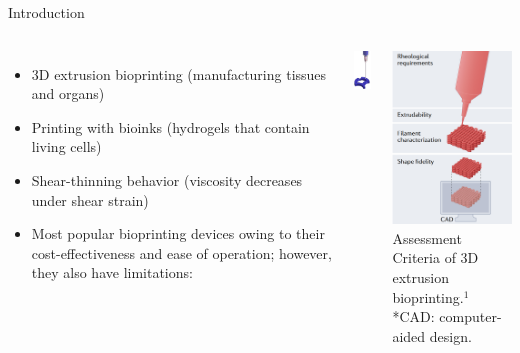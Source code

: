 \begin{frame}{Introduction}
\small
\begin{columns}
\begin{itemize}
\setlength{\itemsep}{2mm}
\item 3D extrusion bioprinting (manufacturing tissues and organs)
\item Printing with bioinks (hydrogels that contain living cells) 
\item Shear-thinning behavior (viscosity decreases under shear strain)
\item Most popular bioprinting devices owing to their cost-effectiveness and ease of operation; however, they also have limitations\footnotemark:
\end{itemize}

\begin{columns}
\centering
\includegraphics[trim = 0mm 0mm 0mm 0mm, clip, width=0.45in]{./images/OsakaU_logo.png}

\end{columns}
\centering
\includegraphics[trim = 0mm 0mm 0mm 0mm, clip, width=1.35in]{./images/intro.png}\\\tiny Assessment Criteria of 3D extrusion bioprinting.$^1$ \\ *CAD: computer-aided design.

\end{columns}
\end{frame}


